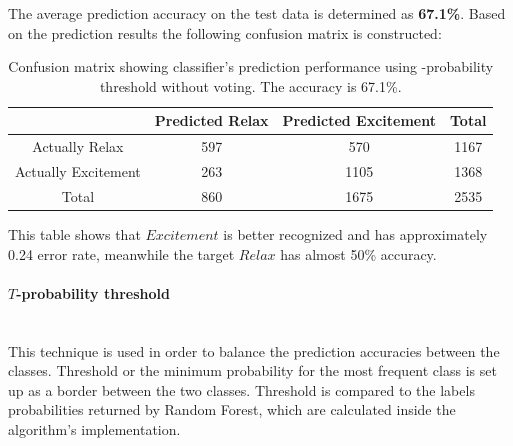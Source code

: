 \documentclass[12pt]{article}
\theoremstyle{definition}
\begin{document}
The average prediction accuracy on the test data is determined as \textbf{67.1\%}. Based on the prediction results the following confusion matrix is constructed:
\begin{table}[H]
\begin{center}
  \begin{tabular}{ | c | c | c | c | }
    \hline
     & Predicted Relax & Predicted Excitement & Total \\ \hline
    Actually Relax & 597 & 570 & 1167 \\ \hline
    Actually Excitement & 263 & 1105 & 1368 \\ \hline
    Total & 860 & 1675 & 2535 \\ 
    \hline
  \end{tabular}
\end{center}
\caption{Confusion matrix showing classifier's prediction performance using -probability threshold without voting. The accuracy is 67.1\%.}
\end{table}

This table shows that $Excitement$ is better recognized and has approximately 0.24 error rate, meanwhile the target $Relax$ has almost 50\% accuracy.

\paragraph{$T$-probability threshold}~\\

This technique is used in order to balance the prediction accuracies between the classes. Threshold or the minimum probability for the most frequent class is set up as a border between the two classes. Threshold is compared to the labels probabilities returned by Random Forest, which are calculated inside the algorithm's implementation. 
\end{document}

